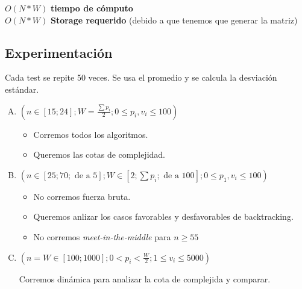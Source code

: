\documentclass[fleqn, 11pt]{article}
\begin{document}
\small $O(N * W)$ \textbf{tiempo de cómputo} \\
\small $O(N * W)$ \textbf{Storage requerido} (debido a que tenemos que generar la matriz) \\

\subsection{Experimentación}

Cada test se repite 50 veces. Se usa el promedio y se calcula la desviación
estándar.

\begin{enumerate}[A.]
\item $(n \in [15; 24];
	W=\frac{\sum p_i}{2};
	0 \leq p_i, v_i \leq 100)$

\begin{itemize}
\item Corremos todos los algoritmos.
\item Queremos las cotas de complejidad.
\end{itemize}

\item $(n \in [25; 70; \text{ de a } 5];
	W \in [2; \sum p_i; \text{ de a } 100];
	0 \leq p_1, v_i \leq 100)$

\begin{itemize}
\item No corremos fuerza bruta.
\item Queremos anlizar los casos favorables y desfavorables de backtracking.
\item No corremos \emph{meet-in-the-middle} para $n \geq 55$
\end{itemize}

\item $(n = W \in [100; 1000];
        0 < p_i < \frac{W}{2};
        1 \leq v_i \leq 5000)$

Corremos dinámica para analizar la cota de complejida y comparar.
\end{enumerate}
\end{document}
